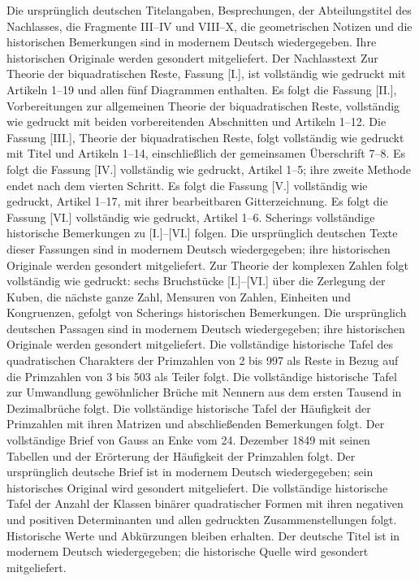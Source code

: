 \begin{titlepage}
\begin{minipage}{0.98\linewidth}
\end{minipage}\clearpage\thispagestyle{empty}
\begin{minipage}{0.98\linewidth}\small
Die ursprünglich deutschen Titelangaben, Besprechungen, der Abteilungstitel des Nachlasses, die Fragmente III–IV und VIII–X, die geometrischen Notizen und die historischen Bemerkungen sind in modernem Deutsch wiedergegeben. Ihre historischen Originale werden gesondert mitgeliefert. Der Nachlasstext Zur Theorie der biquadratischen Reste, Fassung [I.], ist vollständig wie gedruckt mit Artikeln 1–19 und allen fünf Diagrammen enthalten. Es folgt die Fassung [II.], Vorbereitungen zur allgemeinen Theorie der biquadratischen Reste, vollständig wie gedruckt mit beiden vorbereitenden Abschnitten und Artikeln 1–12. Die Fassung [III.], Theorie der biquadratischen Reste, folgt vollständig wie gedruckt mit Titel und Artikeln 1–14, einschließlich der gemeinsamen Überschrift 7–8. Es folgt die Fassung [IV.] vollständig wie gedruckt, Artikel 1–5; ihre zweite Methode endet nach dem vierten Schritt. Es folgt die Fassung [V.] vollständig wie gedruckt, Artikel 1–17, mit ihrer bearbeitbaren Gitterzeichnung. Es folgt die Fassung [VI.] vollständig wie gedruckt, Artikel 1–6. Scherings vollständige historische Bemerkungen zu [I.]–[VI.] folgen. Die ursprünglich deutschen Texte dieser Fassungen sind in modernem Deutsch wiedergegeben; ihre historischen Originale werden gesondert mitgeliefert. Zur Theorie der komplexen Zahlen folgt vollständig wie gedruckt: sechs Bruchstücke [I.]–[VI.] über die Zerlegung der Kuben, die nächste ganze Zahl, Mensuren von Zahlen, Einheiten und Kongruenzen, gefolgt von Scherings historischen Bemerkungen. Die ursprünglich deutschen Passagen sind in modernem Deutsch wiedergegeben; ihre historischen Originale werden gesondert mitgeliefert. Die vollständige historische Tafel des quadratischen Charakters der Primzahlen von 2 bis 997 als Reste in Bezug auf die Primzahlen von 3 bis 503 als Teiler folgt. Die vollständige historische Tafel zur Umwandlung gewöhnlicher Brüche mit Nennern aus dem ersten Tausend in Dezimalbrüche folgt. Die vollständige historische Tafel der Häufigkeit der Primzahlen mit ihren Matrizen und abschließenden Bemerkungen folgt. Der vollständige Brief von Gauss an Enke vom 24. Dezember 1849 mit seinen Tabellen und der Erörterung der Häufigkeit der Primzahlen folgt. Der ursprünglich deutsche Brief ist in modernem Deutsch wiedergegeben; sein historisches Original wird gesondert mitgeliefert. Die vollständige historische Tafel der Anzahl der Klassen binärer quadratischer Formen mit ihren negativen und positiven Determinanten und allen gedruckten Zusammenstellungen folgt. Historische Werte und Abkürzungen bleiben erhalten. Der deutsche Titel ist in modernem Deutsch wiedergegeben; die historische Quelle wird gesondert mitgeliefert. \end{minipage}\clearpage\thispagestyle{empty}

\end{titlepage}
